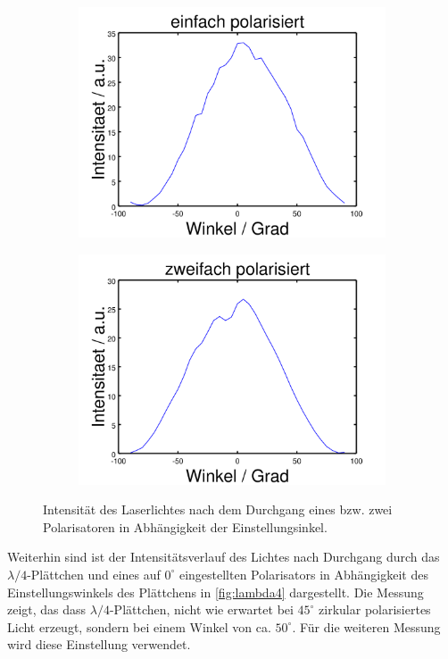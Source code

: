\documentclass[numbers=noenddot,a4paper,notitlepage,twoside,BCOR15mm]{scrartcl}
\begin{document}
	\begin{figure}[h]
		\centering
		\begin{subfigure}{.49\textwidth}
			\centering
			\includegraphics[width=0.8\linewidth]{pics/1xpol.png}
		\end{subfigure}
		\begin{subfigure}{.49\textwidth}
			\centering
			\includegraphics[width=0.8\linewidth]{pics/2xpol.png}
		\end{subfigure}
		\caption{Intensität des Laserlichtes nach dem Durchgang eines bzw. zwei Polarisatoren in Abhängigkeit der Einstellungsinkel.}
		\label{fig:1xpol}
	\end{figure}
	
	Weiterhin sind ist der Intensitätsverlauf des Lichtes nach Durchgang durch das $\lambda/4$-Plättchen und eines auf $0^\circ$ eingestellten Polarisators in Abhängigkeit des Einstellungswinkels des Plättchens in \autoref{fig:lambda4} dargestellt. Die Messung zeigt, das dass $\lambda /4$-Plättchen, nicht wie erwartet bei $45^\circ$ zirkular polarisiertes Licht erzeugt, sondern bei einem Winkel von ca. $50^\circ$. Für die weiteren Messung wird diese Einstellung verwendet. \clearpage
	
\end{document}
